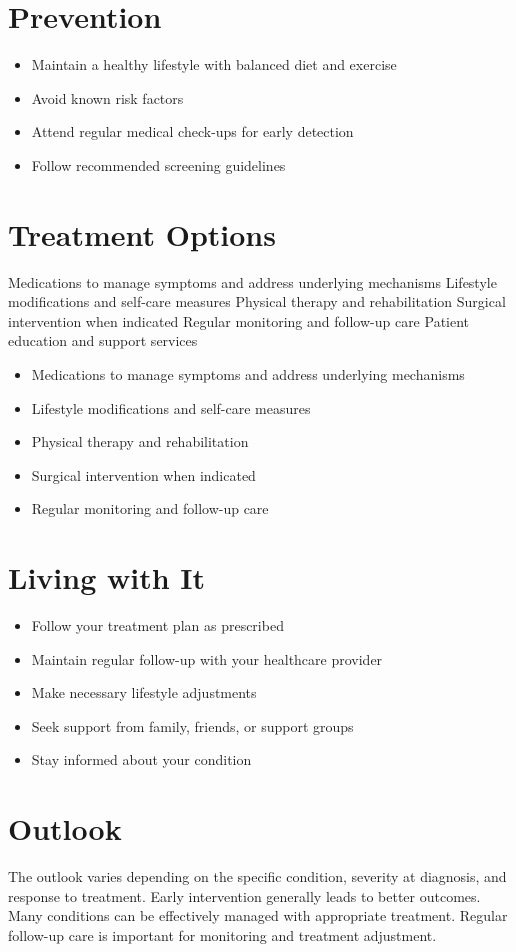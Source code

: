 \section{Prevention}
\begin{itemize}[noitemsep]
  \item Maintain a healthy lifestyle with balanced diet and exercise
  \item Avoid known risk factors
  \item Attend regular medical check-ups for early detection
  \item Follow recommended screening guidelines
\end{itemize}
\section{Treatment Options}
Medications to manage symptoms and address underlying mechanisms Lifestyle modifications and self-care measures Physical therapy and rehabilitation Surgical intervention when indicated Regular monitoring and follow-up care Patient education and support services

\begin{itemize}[noitemsep]
  \item Medications to manage symptoms and address underlying mechanisms
  \item Lifestyle modifications and self-care measures
  \item Physical therapy and rehabilitation
  \item Surgical intervention when indicated
  \item Regular monitoring and follow-up care
\end{itemize}
\section{Living with It}
\begin{itemize}[noitemsep]
  \item Follow your treatment plan as prescribed
  \item Maintain regular follow-up with your healthcare provider
  \item Make necessary lifestyle adjustments
  \item Seek support from family, friends, or support groups
  \item Stay informed about your condition
\end{itemize}
\section{Outlook}
The outlook varies depending on the specific condition, severity at diagnosis, and response to treatment. Early intervention generally leads to better outcomes. Many conditions can be effectively managed with appropriate treatment. Regular follow-up care is important for monitoring and treatment adjustment.
